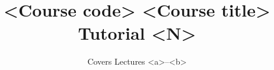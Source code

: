 \documentclass[11pt,a4paper]{article}
\usepackage[margin=2.3cm]{geometry}
\usepackage{amsmath,amssymb,amsthm,bm}
\usepackage{booktabs}
\usepackage{enumitem}
\usepackage{xcolor}
\usepackage{hyperref}
\hypersetup{colorlinks,linkcolor=blue!50!black,urlcolor=blue!50!black}

\newcommand{\R}{\mathbb{R}}
\newcommand{\ptag}[2]{\hfill\mbox{\small(#1, #2)}}

\title{\textbf{<Course code> <Course title>}\\[4pt]
\large Tutorial <N>}   %
\author{Covers Lectures <a>--<b>}
\date{}


\maketitle

\section*{A. Warm-up}
\begin{enumerate}[label=\arabic*.,series=problems]
\item <problem> \ptag{<CO1>}{<L2>}   %
\end{enumerate}

\section*{B. Standard}
\begin{enumerate}[resume*=problems]
\item <problem> \ptag{<CO1>}{<L3>}
\end{enumerate}

\section*{C. Challenge}
\begin{enumerate}[resume*=problems]
\item <problem> \ptag{<CO1>}{<L4>}
\end{enumerate}


